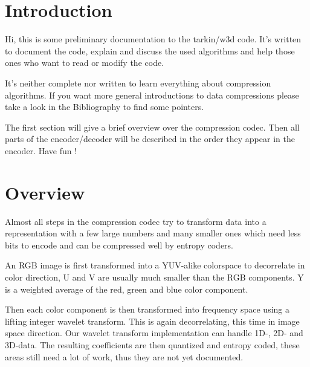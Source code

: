 \section{ Introduction }

Hi, this is some preliminary documentation to the tarkin/w3d code. It's written
to document the code, explain and discuss the used algorithms and help those 
ones who want to read or modify the code.

It's neither complete nor written to learn everything about compression 
algorithms. If you want more general introductions to data compressions please 
take a look in the Bibliography to find some pointers.

The first section will give a brief overview over the compression codec.
Then all parts of the encoder/decoder will be described in the order they appear
in the encoder. Have fun !


\section{ Overview }

Almost all steps in the compression codec try to transform data into a 
representation with a few large numbers and many smaller ones which need
less bits to encode and can be compressed well by entropy coders.

An RGB image is first transformed into a YUV-alike colorspace to decorrelate in
color direction, U and V are usually much smaller than the RGB components.
Y is a weighted average of the red, green and blue color component.

Then each color component is then transformed into frequency space using a 
lifting integer wavelet transform. This is again decorrelating, this time in 
image space direction. Our wavelet transform implementation can handle 1D-, 
2D- and 3D-data. The resulting coefficients are then quantized and entropy 
coded, these areas still need a lot of work, thus they are not yet documented.


